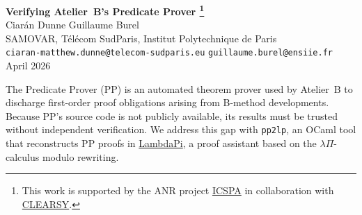\documentclass[11pt]{article}
\begin{document}
\begin{center}
	{\LARGE\bfseries Verifying Atelier~B's Predicate Prover%
		\footnote{This work is supported by the
			ANR project
			\href{https://anr.fr/Project-ANR-21-CE25-0015}{ICSPA}
			in collaboration with
			\href{https://www.clearsy.com/en/}{CLEARSY}.}}\\[12pt]
	{\large Ciarán Dunne \quad Guillaume Burel}\\[4pt]
	{\small
	SAMOVAR, Télécom SudParis, Institut Polytechnique de Paris\\[2pt]
	\texttt{ciaran-matthew.dunne@telecom-sudparis.eu}
	\quad
	\texttt{guillaume.burel@ensiie.fr}
	}\\[6pt]
	{\small April 2026}
\end{center}

\vspace{4pt}

\noindent
The Predicate Prover (PP) is an automated theorem prover
used by Atelier~B to discharge first-order proof obligations
arising from B-method developments.
Because PP's source code is not publicly available,
its results must be trusted without independent verification.
We address this gap with \texttt{pp2lp}, an OCaml tool that
reconstructs PP proofs in
\href{https://github.com/Deducteam/lambdapi}{LambdaPi},
a proof assistant based on the $\lambda\Pi$-calculus modulo rewriting.
\end{document}
